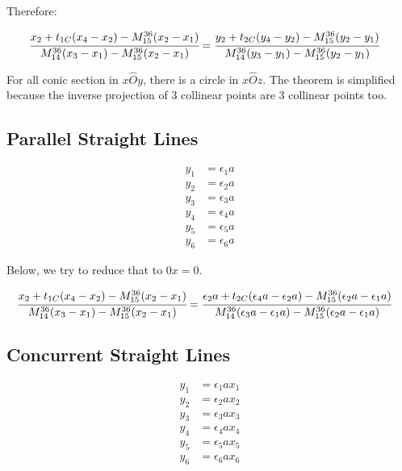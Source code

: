\documentclass[12pt]{article}
\begin{document}

Therefore:

\begin{align}
\cfrac{x_2 + t_{1C} (x_4 - x_2) - M_{15}^{36}(x_2 - x_1)}{M_{14}^{36} (x_3 - x_1) - M_{15}^{36}(x_2 - x_1)} &=\cfrac{y_2 + t_{2C} (y_4 - y_2) - M_{15}^{36}(y_2 - y_1)}{ M_{14}^{36}(y_3 - y_1) - M_{15}^{36}(y_2 - y_1)} \label{eq11}
\end{align}

For all conic section in $x\hat O y$, there is a circle in $x\hat O z$. The theorem is simplified because the inverse projection of 3 collinear points are 3 collinear points too.

\subsection{Parallel Straight Lines}

\begin{align}
    y_1 &= \epsilon_1 a \\
    y_2 &= \epsilon_2 a \\
    y_3 &= \epsilon_3 a \\
    y_4 &= \epsilon_4 a \\
    y_5 &= \epsilon_5 a \\
    y_6 &= \epsilon_6 a 
\end{align}

Below, we try to reduce that to $0x = 0$.

\begin{align}
\cfrac{x_2 + t_{1C} (x_4 - x_2) - M_{15}^{36}(x_2 - x_1)}{M_{14}^{36} (x_3 - x_1) - M_{15}^{36}(x_2 - x_1)} &=\cfrac{\epsilon_2 a + t_{2C} (\epsilon_4 a - \epsilon_2 a) - M_{15}^{36}(\epsilon_2 a - \epsilon_1 a)}{M_{14}^{36}(\epsilon_3 a - \epsilon_1 a) - M_{15}^{36}(\epsilon_2 a - \epsilon_1 a)}
\end{align}

\subsection{Concurrent Straight Lines}

\begin{align}
    y_1 &= \epsilon_1 ax_1 \\
    y_2 &= \epsilon_2 ax_2 \\
    y_3 &= \epsilon_3 ax_3 \\
    y_4 &= \epsilon_4 ax_4 \\
    y_5 &= \epsilon_5 ax_5 \\
    y_6 &= \epsilon_6 ax_6 
\end{align}
\end{document}
